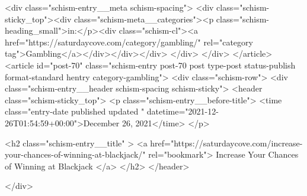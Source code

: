 {		<div class="schism-entry__meta schism-spacing">			<div class="schism-sticky_top"><div class="schism-meta__categories"><p class="schism-heading_small">in:</p><div class="schism-cl"><a href="https://saturdaycove.com/category/gambling/" rel="category tag">Gambling</a></div></div></div>		</div>
	</div>
</article>
<article id="post-70" class="schism-entry post-70 post type-post status-publish format-standard hentry category-gambling">
	<div class="schism-row">		<div class="schism-entry__header schism-spacing schism-sticky">			<header class="schism-sticky_top">				<p class="schism-entry__before-title">
					<time class="entry-date published updated " datetime="2021-12-26T01:54:59+00:00">December 26, 2021</time>				</p>

				<h2 class="schism-entry__title" >
					<a href="https://saturdaycove.com/increase-your-chances-of-winning-at-blackjack/" rel="bookmark">
						Increase Your Chances of Winning at Blackjack					</a>
				</h2>
			</header>

					</div>

}
